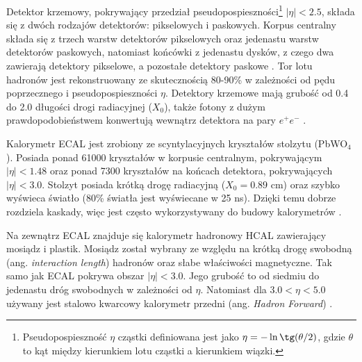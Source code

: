 \documentclass{pracalicmgr}
\begin{document}
	Detektor krzemowy, pokrywający przedział pseudopospieszności\footnote{Pseudopospieszność $\eta$ cząstki definiowana jest jako $\eta = -\ln \tg(\theta/2)$, gdzie $\theta$ to kąt między kierunkiem lotu cząstki a kierunkiem wiązki.} $|\eta| < 2.5$, składa się z dwóch rodzajów detektorów: pikselowych i paskowych. Korpus centralny składa się z trzech warstw detektorów pikselowych oraz jedenastu warstw detektorów paskowych, natomiast końcówki z jedenastu dysków, z czego dwa zawierają detektory pikselowe, a pozostałe detektory paskowe \cite{cms_technical}. Tor lotu hadronów jest rekonstruowany ze skutecznością 80-90\% w zależności od pędu poprzecznego i pseudopospieszności $\eta$. Detektory krzemowe mają grubość od 0.4 do 2.0 długości drogi radiacyjnej ($X_0$), także fotony z dużym prawdopodobieństwem konwertują wewnątrz detektora na pary $e^+e^-$ \cite{tauid13}.
	
	Kalorymetr ECAL jest zrobiony ze scyntylacyjnych kryształów stolzytu (PbWO$_4$). Posiada ponad 61000 kryształów w korpusie centralnym, pokrywającym $|\eta| < 1.48$ oraz ponad 7300 kryształów na końcach detektora, pokrywających $|\eta| < 3.0$. Stolzyt posiada krótką drogę radiacyjną ($X_0 = 0.89$ cm) oraz szybko wyświeca światło (80\% światła jest wyświecane w 25 ns). Dzięki temu dobrze rozdziela kaskady, więc jest często wykorzystywany do budowy kalorymetrów \cite{cms_technical}.
	
	Na zewnątrz ECAL znajduje się kalorymetr hadronowy HCAL zawierający mosiądz i plastik. Mosiądz został wybrany ze względu na krótką drogę swobodną (ang. \textit{interaction length}) hadronów oraz słabe właściwości magnetyczne.
Tak samo jak ECAL pokrywa obszar $|\eta| < 3.0$. Jego grubość to od siedmiu do jedenastu dróg swobodnych w zależności od $\eta$. Natomiast dla $3.0 < \eta < 5.0$ używany jest stalowo kwarcowy kalorymetr przedni (ang. \textit{Hadron Forward}) \cite{cms_technical}.
	
\end{document}
